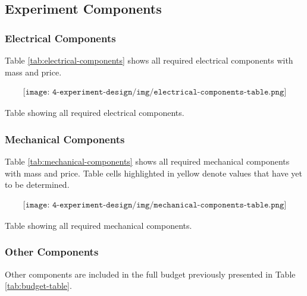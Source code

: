 \begin{landscape}
\subsection{Experiment Components}
\subsubsection{Electrical Components}

Table \ref{tab:electrical-components} shows all required electrical components with mass and price.

%

\begin{table}[H]
    \begin{align*}
        \texttt{[image: 4-experiment-design/img/electrical-components-table.png]}
    \end{align*}
    \caption{Table showing all required electrical components.}\label{tab:electrical-components}
\end{table}

\end{landscape}

\begin{landscape}

\subsubsection{Mechanical Components}

Table \ref{tab:mechanical-components} shows all required mechanical components with mass and price. Table cells highlighted in yellow denote values that have yet to be determined.

%

\begin{table}[H]
    \begin{align*}
        \texttt{[image: 4-experiment-design/img/mechanical-components-table.png]}
    \end{align*}
    \caption{Table showing all required mechanical components.}\label{tab:mechanical-components}
\end{table}

\subsubsection{Other Components}

Other components are included in the full budget previously presented in Table \ref{tab:budget-table}.

\end{landscape}

\raggedbottom
